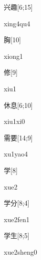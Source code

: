 \begin{verbete}[xing4qu4]{兴趣}[6;15]
\begin{pronuncia}{xing4qu4}
\end{pronuncia}
\end{verbete}

\begin{verbete}[xiong1]{胸}[10]
\begin{pronuncia}{xiong1}
\end{pronuncia}
\end{verbete}

\begin{verbete}[xiu1]{修}[9]
\begin{pronuncia}{xiu1}
\end{pronuncia}
\end{verbete}

\begin{verbete}[xiu1xi0]{休息}[6;10]
\begin{pronuncia}{xiu1xi0}
\end{pronuncia}
\end{verbete}

\begin{verbete}[xu1yao4]{需要}[14;9]
\begin{pronuncia}{xu1yao4}
\end{pronuncia}
\end{verbete}

\begin{verbete}[xue2]{学}[8]
\begin{pronuncia}{xue2}
\end{pronuncia}
\end{verbete}

\begin{verbete}{学分}[8;4]
\begin{pronuncia}{xue2fen1}
\end{pronuncia}
\end{verbete}

\begin{verbete}{学生}[8;5]
\begin{pronuncia}{xue2sheng0}
\end{pronuncia}
\end{verbete}


